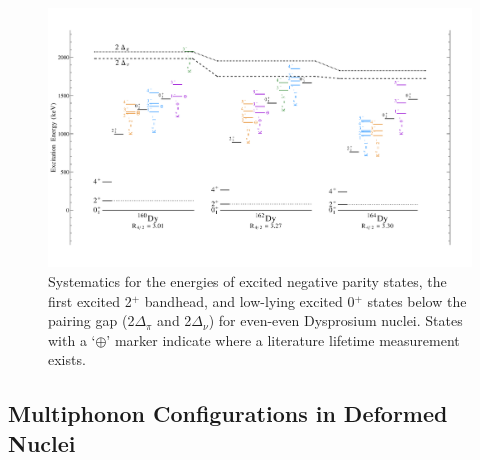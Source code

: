 \begin{landscape}
\begin{figure}[ht] 
\begin{center}
\includegraphics[height=0.8\textheight]{SciDraw_DySystematics_Octupole.pdf}
\caption{Systematics for the energies of excited negative parity states, the first excited 2$^+$ bandhead, and low-lying excited 0$^+$ states below the pairing gap (2$\Delta_\pi$ and 2$\Delta_\nu$) for even-even Dysprosium nuclei. States with a `$\oplus$' marker indicate where a literature lifetime measurement exists.}
\label{fig:DySystematics_Octupole}
\end{center}
\end{figure}
\end{landscape}

\subsection{Multiphonon Configurations in Deformed Nuclei}

